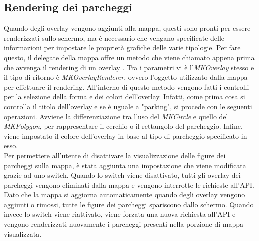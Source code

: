 \subsection{Rendering dei parcheggi}

Quando degli overlay vengono aggiunti alla mappa, questi sono pronti per essere
renderizzati sullo schermo, ma è necessario che vengano specificate delle informazioni
per impostare le proprietà grafiche delle varie tipologie. Per fare questo, il delegate
della mappa offre un metodo che viene chiamato appena prima che avvenga il rendering
di un overlay \cite{dynamic_rendering_map_information}. Tra i parametri vi è 
l'\emph{MKOverlay} stesso e il tipo di ritorno
è \emph{MKOverlayRenderer}, ovvero l'oggetto utilizzato dalla mappa per effettuare 
il rendering. All'interno di questo metodo vengono fatti i controlli per la selezione
della forma e dei colori dell'overlay. Infatti, come prima cosa si controlla il titolo
dell'overlay e se è uguale a "parking", si procede con le seguenti operazioni. Avviene
la differenziazione tra l'uso del \emph{MKCircle} e quello del \emph{MKPolygon}, per 
rappresentare il cerchio o il rettangolo del parcheggio. Infine, viene impostato
il colore dell'overlay in base al tipo di parcheggio specificato in esso.\\
Per permettere all'utente di disattivare la visualizzazione delle figure dei parcheggi
sulla mappa, è stata aggiunta una impostazione che viene modificata grazie ad uno switch.
Quando lo switch viene disattivato, tutti gli overlay dei parcheggi vengono eliminati 
dalla mappa e vengono interrotte le richieste all'API. Dato che la mappa si aggiorna 
automaticamente quando degli overlay vengono aggiunti o rimossi, tutte le figure 
dei parcheggi spariscono dallo schermo. Quando invece lo switch viene riattivato,
viene forzata una nuova richiesta all'API e vengono renderizzati nuovamente i parcheggi
presenti nella porzione di mappa visualizzata.


